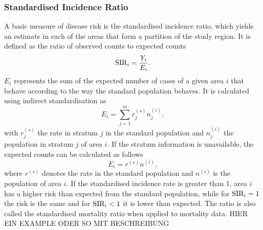\documentclass[12pt]{book}
\begin{document}
\subsubsection{Standardised Incidence Ratio}
A basic measure of disease risk is the standardised incidence ratio, which yields an estimate in each of the areas that form a partition of the study region. It is defined as the ratio of observed counts to expected counts
\begin{equation}
    \hbox{SIR}_i = \frac{Y_i}{E_i}.
\end{equation}
$E_i$ represents the sum of the expected number of cases of a given area $i$ that behave according to the way the standard population behaves. It is calculated using indirect standardisation as
\begin{equation}
    E_i=\sum_{j=1}^mr_j^{(s)}n_j^{(i)},
\end{equation}
with $r_j^{(s)}$ the rate in stratum $j$ in the standard population and $n_j^{(i)}$ the population in stratum $j$ of area $i$. If the stratum information is unavailable, the expected counts can be calculated as follows
\begin{equation*}
    E_i = r^{(s)}n^{(i)},
\end{equation*}
where $r^{(s)}$ denotes the rate in the standard population and $n^{(i)}$ is the population of area $i$. If the standardised incidence rate is greater than 1, area $i$ has a higher risk than expected from the standard population, while for $\hbox{SIR}_i = 1$ the risk is the same and for $\hbox{SIR}_i < 1$ it is lower than expected. The ratio is also called the standardised mortality ratio when applied to mortality data.
HIER EIN EXAMPLE ODER SO MIT BESCHREIBUNG
\end{document}
